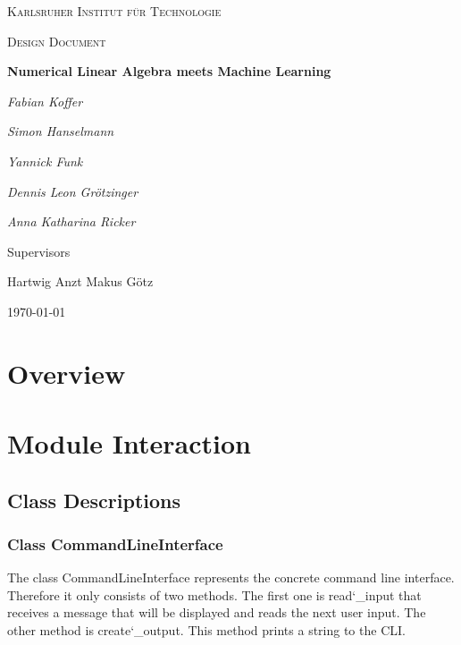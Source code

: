 \documentclass[parskip=full]{scrartcl}
\begin{document}
\begin{titlepage}
\centering
{\scshape\LARGE Karlsruher Institut für Technologie\par}
\vspace{1cm}
{\scshape\Large Design Document\par}
\vspace{1.5cm}
{\huge\bfseries Numerical Linear Algebra meets Machine Learning \par}
\vspace {2cm}

{\Large\itshape Fabian Koffer\par}
{\Large\itshape Simon Hanselmann\par}
{\Large\itshape Yannick Funk\par}
{\Large\itshape Dennis Leon Gr\"{o}tzinger\par}
{\Large\itshape Anna Katharina Ricker\par}

\vfill
Supervisors\par
Hartwig Anzt
Makus G\"{o}tz

\vfill
{\large\today\par}
\end{titlepage}

\tableofcontents
\newpage

\section{Overview}


\section{Module Interaction}

\subsection{Class Descriptions}

\subsubsection{Class CommandLineInterface}
The class CommandLineInterface represents the concrete command line interface. 
Therefore it only consists of two methods. 
The first one is read\char`_input that receives a message that will be displayed and reads the next user input. 
The other method is create\char`_output. 
This method prints a string to the CLI.
\end{document}
